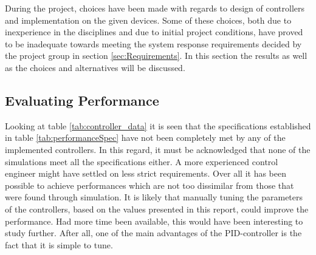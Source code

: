 \documentclass[../../main.tex]{subfiles}
\begin{document}

During the project, choices have been made with regards to design of controllers and implementation on the given devices. Some of these choices, both due to inexperience in the disciplines and due to initial project conditions, have proved to be inadequate towards meeting the system response requirements decided by the project group in section \ref{sec:Requirements}. In this section the results as well as the choices and alternatives will be discussed.

\subsection{Evaluating Performance}

Looking at table \ref{tab:controller_data} it is seen that the specifications established in table \ref{tab:performanceSpec} have not been completely met by any of the implemented controllers. In this regard, it must be acknowledged that none of the simulations meet all the specifications either. A more experienced control engineer might have settled on less strict requirements.
Over all it has been possible to achieve performances which are not too dissimilar from those that were found through simulation. It is likely that manually tuning the parameters of the controllers, based on the values presented in this report, could improve the performance. Had more time been available, this would have been interesting to study further. After all, one of the main advantages of the PID-controller is the fact that it is simple to tune. 
\end{document}
